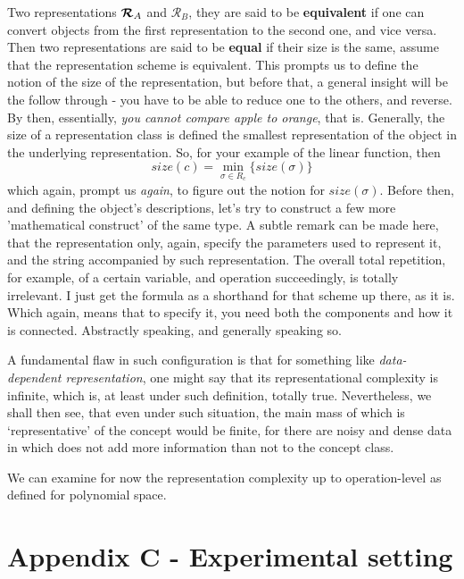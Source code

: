 \documentclass[10pt]{article} %
\begin{document}
Two representations $\bm{\mathcal{R}}_{A}$ and $\mathcal{R}_{B}$, they are said to be \textbf{equivalent} if one can convert objects from the first representation to the second one, and vice versa. Then two representations are said to be \textbf{equal} if their size is the same, assume that the representation scheme is equivalent. This prompts us to define the notion of the size of the representation, but before that, a general insight will be the follow through - you have to be able to reduce one to the others, and reverse. By then, essentially, \textit{you cannot compare apple to orange}, that is. Generally, the size of a representation class is defined the smallest representation of the object in the underlying representation. So, for your example of the linear function, then 
\begin{equation}
    size(c)=\min_{\sigma \in R_{c}}\{size(\sigma)\}
\end{equation}
which again, prompt us \textit{again}, to figure out the notion for $size(\sigma)$. Before then, and defining the object's descriptions, let's try to construct a few more 'mathematical construct' of the same type. A subtle remark can be made here, that the representation only, again, specify the parameters used to represent it, and the string accompanied by such representation. The overall total repetition, for example, of a certain variable, and operation succeedingly, is totally irrelevant. I just get the formula as a shorthand for that scheme up there, as it is. Which again, means that to specify it, you need both the components and how it is connected. Abstractly speaking, and generally speaking so. 

A fundamental flaw in such configuration is that for something like \textit{data-dependent representation}, one might say that its representational complexity is infinite, which is, at least under such definition, totally true. Nevertheless, we shall then see, that even under such situation, the main mass of which is `representative' of the concept would be finite, for there are noisy and dense data in which does not add more information than not to the concept class. 

We can examine for now the representation complexity up to operation-level as defined for polynomial space. 

\section*{Appendix C - Experimental setting}
\end{document}

